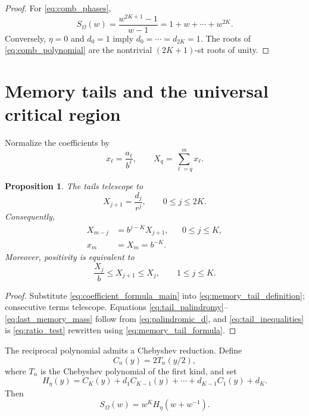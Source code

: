 \documentclass[11pt]{amsart}
\numberwithin{equation}{section}
\theoremstyle{plain}
\newtheorem{proposition}[theorem]{Proposition}
\theoremstyle{definition}
\theoremstyle{remark}
\begin{document}
\begin{proof}
For \eqref{eq:comb_phases},
\begin{equation}
S_\Omega(w)=\frac{w^{2K+1}-1}{w-1}
=1+w+\cdots+w^{2K}.
\label{eq:comb_polynomial}
\end{equation}
Conversely, $\eta=0$ and $d_0=1$ imply $d_0=\cdots=d_{2K}=1$.  The roots of \eqref{eq:comb_polynomial} are the nontrivial $(2K+1)$-st roots of unity.
\end{proof}

\section{Memory tails and the universal critical region}
\label{sec:memory_critical_region}

Normalize the coefficients by
\begin{equation}
x_\ell=\frac{a_\ell}{b^\ell},
\qquad
X_q=\sum_{\ell=q}^{m}x_\ell.
\label{eq:memory_tail_definition}
\end{equation}

\begin{proposition}
\label{prop:memory_tail_formula}
The tails telescope to
\begin{equation}
X_{j+1}=\frac{d_j}{r^j},
\qquad 0\leq j\leq2K.
\label{eq:memory_tail_formula}
\end{equation}
Consequently,
\begin{align}
X_{m-j}&=b^{j-K}X_{j+1},
&&0\leq j\leq K,
\label{eq:tail_palindromy}\\
x_m&=X_m=b^{-K}.
\label{eq:last_memory_mass}
\end{align}
Moreover, positivity is equivalent to
\begin{equation}
\frac{X_j}{b}\leq X_{j+1}\leq X_j,
\qquad 1\leq j\leq K.
\label{eq:tail_inequalities}
\end{equation}
\end{proposition}

\begin{proof}
Substitute \eqref{eq:coefficient_formula_main} into \eqref{eq:memory_tail_definition}; consecutive terms telescope.  Equations \eqref{eq:tail_palindromy}--\eqref{eq:last_memory_mass} follow from \eqref{eq:palindromic_d}, and \eqref{eq:tail_inequalities} is \eqref{eq:ratio_test} rewritten using \eqref{eq:memory_tail_formula}.
\end{proof}

The reciprocal polynomial admits a Chebyshev reduction.  Define
\begin{equation}
C_n(y)=2T_n(y/2),
\label{eq:scaled_chebyshev}
\end{equation}
where $T_n$ is the Chebyshev polynomial of the first kind, and set
\begin{equation}
H_\eta(y)
=C_K(y)+d_1C_{K-1}(y)+\cdots+d_{K-1}C_1(y)+d_K.
\label{eq:H_eta}
\end{equation}
Then
\begin{equation}
S_\Omega(w)=w^KH_\eta(w+w^{-1}).
\label{eq:chebyshev_reduction}
\end{equation}
\end{document}
